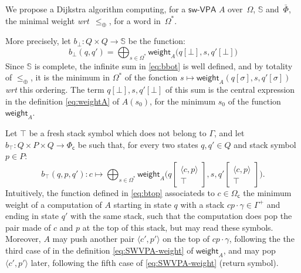 \documentclass[runningheads]{llncs}
\def\wrt{\textit{wrt}\xspace}
\def\<#1>{\langle #1 \rangle}
\newcommand{\config}[2]{\ensuremath{#1}[{#2}]}
\newcommand{\configup}[2]{\ensuremath{#1}\left[\begin{array}{c} #2 \end{array}\right]}
\def\stackup{\\}
\newcommand{\Semiring}{\mathbb{S}}
\def\SWVPA{\textsf{sw-VPA}\xspace}
\def\weight{\mathsf{weight}}
\def\Omegac{{\Omega_\mathsf{c}}}
\def\Phic{{\Phi_\mathsf{c}}}
\begin{document}
We propose a Dijkstra algorithm computing, for a $\SWVPA$ $A$
over~$\Omega$, $\Semiring$ and~$\bar\Phi$, 
the minimal weight \wrt~$\leq_\oplus$, for a word in~$\Omega^*$.

\noindent
More precisely, 
let $b_\bot : Q \times Q \to \Semiring$ be the function:
%
\begin{equation}\label{eq:bbot}
  b_\bot(q, q') = \bigoplus_{s\in \Omega^*} 
  \textstyle
  \weight_A\bigl(\config{q}{\bot}, s, \config{q'}{\bot}\bigr)
\end{equation}
%
Since $\Semiring$ is complete, the infinite sum in \eqref{eq:bbot} is well defined,
and by totality of $\leq_\oplus$, it is the minimum in $\Omega^*$
of the fonction 
$s \mapsto \weight_A(\config{q}{\sigma}, s, \config{q'}{\sigma})$ 
\wrt this ordering.
%
The term $\config{q}{\bot}, s, \config{q'}{\bot}$ 
of this sum is the central expression in 
the definition \eqref{eq:weightA} of $A(s_0)$, for the minimum $s_0$
of the function $\weight_A$.

%
\noindent
Let $\top$ be a fresh stack symbol which does not belong to $\Gamma$,
and let $b_\top : Q \times P \times Q \to \Phic$ be such that,
for every two states $q, q' \in Q$ 
and stack symbol $p \in P$: %
\begin{equation}\label{eq:btop}
  b_\top(q, p, q') : c \mapsto \bigoplus_{s\in \Omega^*} 
  \textstyle
  \weight_A\bigl(\configup{q}{\< c, p> \stackup \top }, s, \configup{q'}{\<c, p> \stackup \top}\bigr). 
\end{equation}
%
Intuitively, the function defined in \eqref{eq:btop}
associateds to $c \in \Omegac$ 
the minimum weight of a computation of $A$
starting in state $q$ with a stack 
$c p \cdot \gamma \in \Gamma^+$ 
and ending in state $q'$ with the same stack,
such that the computation does pop 
the pair made of $c$ and $p$ at the top of this stack,
but may read these symbols.
Moreover, $A$ may push another pair $\< c', p'>$ %
on the top of $c p \cdot \gamma$,
following the the third case of 
in the definition \eqref{eq:SWVPA-weight} of $\weight_A$,
and may pop $\< c', p'>$ later, following the fifth case of \eqref{eq:SWVPA-weight} (return symbol). 
\end{document}

